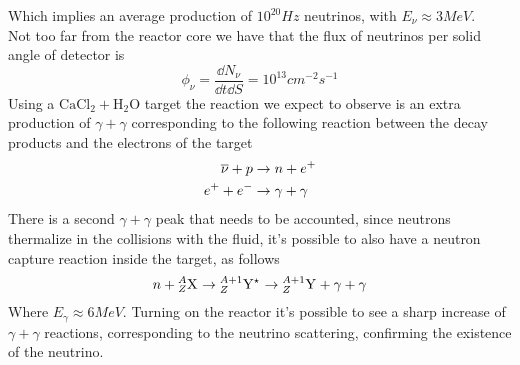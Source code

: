 \documentclass[../qm.tex]{subfiles}
\begin{document}
Which implies an average production of $10^{20}\unit{Hz}$ neutrinos, with $E_\nu\approx3\unit{MeV}$.\\
Not too far from the reactor core we have that the flux of neutrinos per solid angle of detector is
\begin{equation*}
	\phi_\nu=\frac{\dd N_\nu}{\dd t\dd S}=10^{13}\unit{cm^{-2}s^{-1}}
\end{equation*}
Using a $\mathrm{CaCl_2+H_2O}$ target the reaction we expect to observe is an extra production of $\gamma+\gamma$ corresponding to the following reaction between the decay products and the electrons of the target
\begin{equation*}
	\begin{aligned}
		\cc{\nu}+p&\to n+e^+\\
		e^++e^-&\to\gamma+\gamma
	\end{aligned}
\end{equation*}
There is a second $\gamma+\gamma$ peak that needs to be accounted, since neutrons thermalize in the collisions with the fluid, it's possible to also have a neutron capture reaction inside the target, as follows
\begin{equation*}
	n+\nuc{X}{A}{Z}\to\nuc{Y^\star}{A+1}{Z}\to\nuc{Y}{A+1}{Z}+\gamma+\gamma
\end{equation*}
Where $E_\gamma\approx6\unit{MeV}$. Turning on the reactor it's possible to see a sharp increase of $\gamma+\gamma$ reactions, corresponding to the neutrino scattering, confirming the existence of the neutrino.
\end{document}
